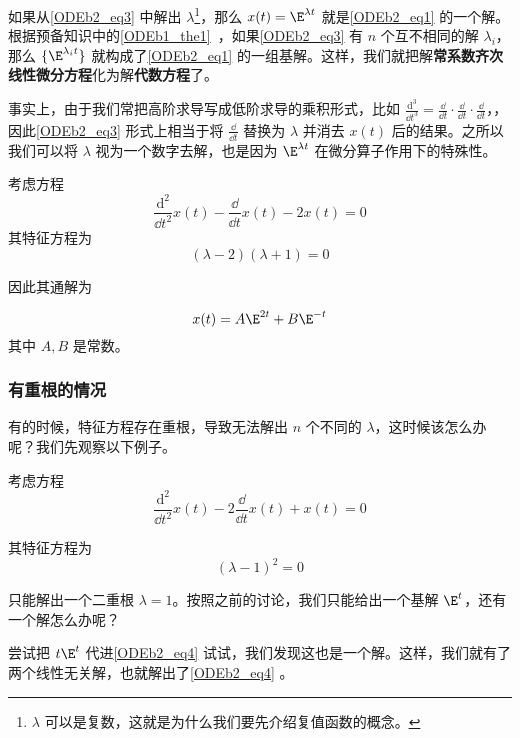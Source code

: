 如果从\autoref{ODEb2_eq3} 中解出 $\lambda$\footnote{$\lambda$ 可以是复数，这就是为什么我们要先介绍复值函数的概念。}，那么 $x(t)=\E^{\lambda t}$ 就是\autoref{ODEb2_eq1} 的一个解。根据预备知识中的\autoref{ODEb1_the1}~，如果\autoref{ODEb2_eq3} 有 $n$ 个互不相同的解 $\lambda_i$，那么 $\{\E^{\lambda_i t}\}$ 就构成了\autoref{ODEb2_eq1} 的一组基解。这样，我们就把解\textbf{常系数齐次线性微分方程}化为解\textbf{代数方程}了。


事实上，由于我们常把高阶求导写成低阶求导的乘积形式，比如 $\frac{\mathrm{d}^3}{\dd t^3}=\frac{\dd }{\dd t}\cdot\frac{\dd }{\dd t}\cdot\frac{\dd }{\dd t}$，，因此\autoref{ODEb2_eq3} 形式上相当于将 $\frac{\dd }{\dd t}$ 替换为 $\lambda$ 并消去 $x(t)$ 后的结果。之所以我们可以将 $\lambda$ 视为一个数字去解，也是因为 $\E^{\lambda t}$ 在微分算子作用下的特殊性。


\begin{example}{}
考虑方程
\begin{equation}
\frac{\mathrm{d}^2}{\dd t^2}x(t)-\frac{\dd }{\dd t}x(t)-2x(t)=0
\end{equation}
其特征方程为
\begin{equation}
(\lambda-2)(\lambda+1)=0
\end{equation}

因此其通解为

\begin{equation}
x(t)=A\E^{2t}+B\E^{-t}
\end{equation}
其中 $A, B$ 是常数。




\end{example}






\subsubsection{有重根的情况}



有的时候，特征方程存在重根，导致无法解出 $n$ 个不同的 $\lambda$，这时候该怎么办呢？我们先观察以下例子。

\begin{example}{}\label{ODEb2_ex1}
考虑方程
\begin{equation}\label{ODEb2_eq4}
\frac{\mathrm{d}^2}{\dd t^2}x(t)-2\frac{\dd }{\dd t}x(t)+x(t)=0
\end{equation}

其特征方程为
\begin{equation}
(\lambda-1)^2=0
\end{equation}

只能解出一个二重根 $\lambda=1$。按照之前的讨论，我们只能给出一个基解 $\E^{t}$，还有一个解怎么办呢？

尝试把 $t\E^{t}$ 代进\autoref{ODEb2_eq4} 试试，我们发现这也是一个解。这样，我们就有了两个线性无关解，也就解出了\autoref{ODEb2_eq4} 。




\end{example}




